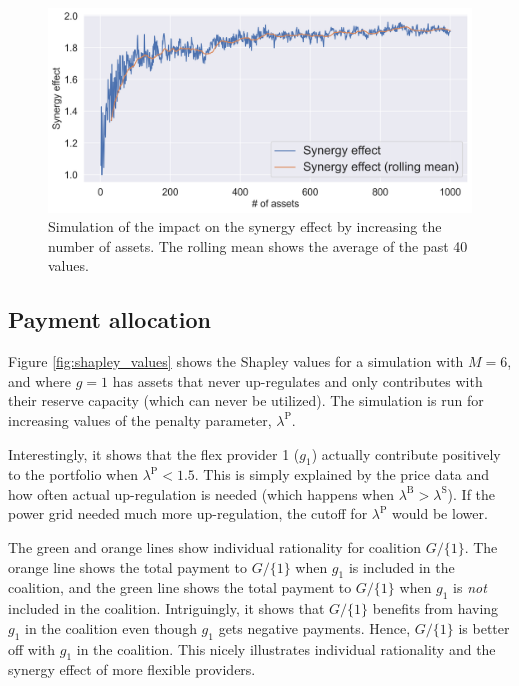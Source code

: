 \documentclass[lettersize,journal]{IEEEtran}
\begin{document}
\begin{figure}[!t]
    \centering
    \includegraphics[width=\columnwidth]{figures/synergy_effect.png}
    \caption{Simulation of the impact on the synergy effect by increasing the number of assets. The rolling mean shows the average of the past 40 values.}
    \label{fig:synergy_effect}
\end{figure}

\subsection{Payment allocation}

Figure \ref{fig:shapley_values} shows the Shapley values for a simulation with $M = 6$, and where $g = 1$ has assets that never up-regulates and only contributes with their reserve capacity (which can never be utilized). The simulation is run for increasing values of the penalty parameter, $\lambda^{\text{P}}$.

Interestingly, it shows that the flex provider 1 ($g_1$) actually contribute positively to the portfolio when $\lambda^{\text{P}} < 1.5$. This is simply explained by the price data and how often actual up-regulation is needed (which happens when $\lambda^{\text{B}} > \lambda^{\text{S}}$). If the power grid needed much more up-regulation, the cutoff for $\lambda^{\text{P}}$ would be lower.

The green and orange lines show individual rationality for coalition $G / \{1\}$. The orange line shows the total payment to $G / \{1\}$ when $g_1$ is included in the coalition, and the green line shows the total payment to $G / \{1\}$ when $g_1$ is \textit{not} included in the coalition. Intriguingly, it shows that $G / \{1\}$ benefits from having $g_1$ in the coalition even though $g_1$ gets negative payments. Hence, $G / \{1\}$ is better off with $g_1$ in the coalition. This nicely illustrates individual rationality and the synergy effect of more flexible providers.
\end{document}
